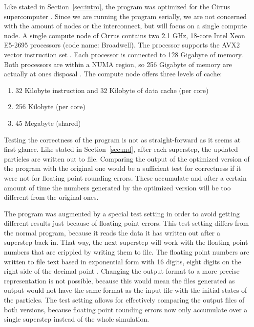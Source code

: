 \documentclass[twoside,11pt]{article}
\begin{document}
Like stated in Section~\ref{sec:intro}, the program was optimized for
the Cirrus supercomputer \citep{cirrus}.
Since we are running the program serially, we are not concerned with
the amount of nodes or the interconnect, but will focus on a single
compute node.
A single compute node of Cirrus contains two 2.1 GHz, 18-core Intel
Xeon E5-2695 processors (code name: Broadwell).
The processor supports the AVX2 vector instruction set \citep{avx2}.
Each processor is connected to 128 Gigabyte of memory.
Both processors are within a NUMA region, so 256 Gigabyte of memory
are actually at ones disposal \citep{cirrus_hardware}.
The compute node offers three levels of cache:
\begin{enumerate}
  \item 32 Kilobyte instruction and 32 Kilobyte of data cache
        (per core)
  \item 256 Kilobyte (per core)
  \item 45 Megabyte (shared)
\end{enumerate}

Testing the correctness of the program is not as straight-forward as
it seems at first glance.
Like stated in Section~\ref{sec:md}, after each superstep, the
updated particles are written out to file.
Comparing the output of the optimized version of the program with the
original one would be a sufficient test for correctness if it were
not for floating point rounding errors.
These accumulate and after a certain amount of time the numbers
generated by the optimized version will be too different from the
original ones.

The program was augmented by a special test setting in order to avoid
getting different results just because of floating point errors.
This test setting differs from the normal program, because it reads
the data it has written out after a superstep back in.
That way, the next superstep will work with the floating point numbers
that are crippled by writing them to file.
The floating point numbers are written to file text based in
exponential form with 16 digits, eight digits on the right side of the
decimal point \citep[see e.g.][for formatting IO in Fortran]
{fortran_formats}.
Changing the output format to a more precise representation is not
possible, because this would mean the files generated as output would
not have the same format as the input file with the initial states of
the particles.
The test setting allows for effectively comparing the output files of
both versions, because floating point rounding errors now only
accumulate over a single superstep instead of the whole simulation.
\end{document}
